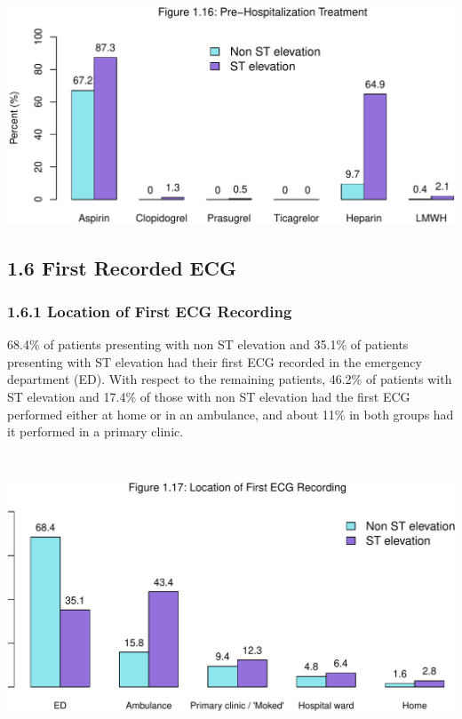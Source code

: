 \documentclass[
]{article}
\begin{document}
\includegraphics{ACSIS_2024_v1_pdf_files/figure-latex/unnamed-chunk-54-1.pdf}

\pagebreak

\subsection{1.6 First Recorded ECG}\label{first-recorded-ecg}

\subsubsection{1.6.1 Location of First ECG
Recording}\label{location-of-first-ecg-recording}

68.4\% of patients presenting with non ST elevation and 35.1\% of
patients presenting with ST elevation had their first ECG recorded in
the emergency department (ED). With respect to the remaining patients,
46.2\% of patients with ST elevation and 17.4\% of those with non ST
elevation had the first ECG performed either at home or in an ambulance,
and about 11\% in both groups had it performed in a primary clinic.

~

\includegraphics{ACSIS_2024_v1_pdf_files/figure-latex/unnamed-chunk-55-1.pdf}
\end{document}
